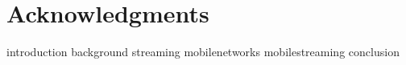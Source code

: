 \documentclass[openright,titlepage,numbers=noenddot,headinclude,footinclude=true,cleardoublepage=empty,BCOR=5mm,paper=A4,fontsize=11pt,twoside]{scrreprt}
\begin{document}




\newpage
{}
\tableofcontents



\newpage
	\printglossaries

\newpage
{}
\listoffigures

\newpage
{}
\listoftables

\cleardoublepage


\cleardoublepage


\newtheorem{mydef}{Definition}
\cleardoublepage
\chapter*{Acknowledgments}

\cleardoublepage
{}


{introduction}
{background}
{streaming}
{mobilenetworks}
{mobilestreaming}
{conclusion}






\begingroup
\RaggedRight
\printbibliography
\endgroup

\end{document}
